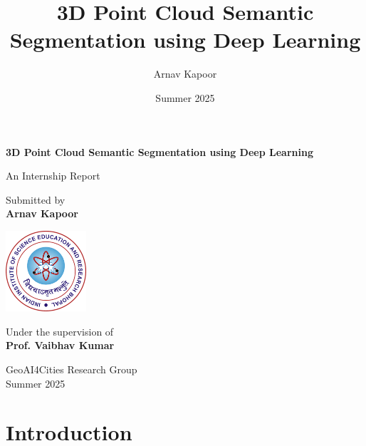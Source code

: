 \documentclass[12pt,a4paper]{report}
\title{3D Point Cloud Semantic Segmentation using Deep Learning}
\author{Arnav Kapoor}
\date{Summer 2025}
\begin{document}
\begin{titlepage}
    \centering
    \vspace*{1cm}
    
    {\LARGE\textbf{3D Point Cloud Semantic Segmentation using Deep Learning}}
    
    \vspace{0.5cm}
    {\Large An Internship Report}
    
    \vspace{2cm}
    
    {\large Submitted by}\\
    \vspace{0.5cm}
    {\Large\textbf{Arnav Kapoor}}
    
    \vspace{2cm}
    
    \includegraphics[width=3cm]{logo.png}
    
    \vspace{1cm}
    
    {\large Under the supervision of}\\
    \vspace{0.5cm}
    {\Large\textbf{Prof. Vaibhav Kumar}}
    
    \vspace{2cm}
    
    {\large GeoAI4Cities Research Group}\\
    {\large Summer 2025}
    
\end{titlepage}

\tableofcontents
\newpage

\listoffigures
{}
\newpage

\listoftables
{}
\newpage


\chapter{Introduction}
\end{document}
